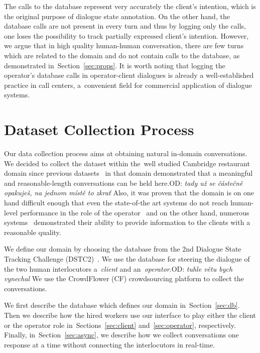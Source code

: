 \documentclass[runningheads,a4paper]{llncs}
\def\OD#1{{\color{darkgreen}OD: \it #1}}
\begin{document}
The calls to the database represent very accurately the client's intention, which is the original purpose of dialogue state annotation.
On the other hand, the database calls are not present in every turn and thus by logging only the calls, one loses the possibility to track partially expressed client's intention.
However, we argue that in high quality human-human conversation, there are few turns which are related to the domain and do not contain calls to the database, as demonstrated in~Section~\ref{sec:props}.
It is worth noting that logging the operator's database calls in operator-client dialogues is already a well-established practice in call centers, a~convenient field for commercial application of dialogue systems.

\section{Dataset Collection Process} \label{sec:collection}
\vspace{-0.50em}
Our data collection process aims at obtaining natural in-domain conversations.
We decided to collect the dataset within the~well studied Cambridge restaurant domain since previous datasets~\cite{williams2013dstc1,henderson2014dstc2,henderson2014dstc3} in that domain demonstrated that a meaningful and reasonable-length conversations can be held here.\OD{tady už se částečně opakuješ, na jednom místě to zkrať}
Also, it was proven that the domain is on one hand difficult enough that even the state-of-the art systems do not reach human-level performance in the role of the operator~\cite{henderson2014dstc2} and on the other hand, numerous systems~\cite{young2010hidden,gasic2011line,wen2016network} demonstrated their ability to provide information to the clients with a reasonable quality.

We define our domain by choosing the database from the 2nd Dialogue State Tracking Challenge (DSTC2)~\cite{henderson2014dstc2}.
We use the database for steering the dialogue of the two human interlocutors a~{\it client} and an~{\it operator}.\OD{tuhle větu bych vynechal}
We use the CrowdFlower (CF) crowdsourcing platform to collect the conversations.

We first describe the database which defines our domain in~Section~\ref{sec:db}.
Then we describe how the hired workers use our interface to play either the client or the operator role in~Sections~\ref{sec:client} and~\ref{sec:operator}, respectively.
Finally, in~Section~\ref{sec:async}, we describe how we collect conversations one response at a time without connecting the interlocutors in real-time. 
\end{document}
